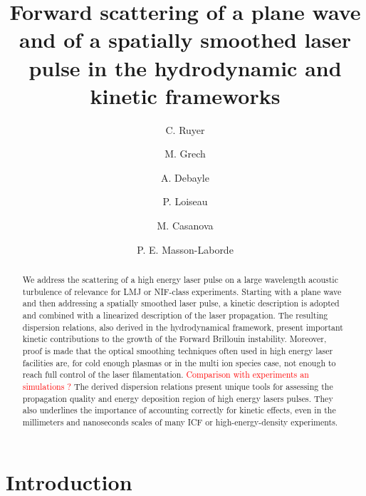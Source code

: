 \documentclass[
 reprint,
 amsmath,amssymb,
 aps,
]{revtex4-1}
\begin{document}
\title{ 
Forward scattering of a plane wave and of a spatially smoothed laser pulse  in the hydrodynamic and kinetic frameworks }
\author{C. Ruyer}
\author{M. Grech}
\author{A. Debayle}
\author{P. Loiseau}
\author{M. Casanova}
\author{P. E. Masson-Laborde}

\begin{abstract}
We address the scattering of a high energy laser pulse on a   large wavelength acoustic turbulence of relevance for LMJ or NIF-class  experiments. 
Starting with a plane wave and then addressing a spatially smoothed laser pulse, 
a kinetic description is adopted and combined with a linearized  description of the laser propagation. The resulting dispersion relations, also derived in the hydrodynamical framework, present important kinetic  contributions to the growth of the Forward Brillouin instability.  
Moreover, proof is made that the optical smoothing techniques  often used in high energy laser facilities are, for cold enough plasmas or in the multi ion species case, not enough to reach full control of the laser filamentation.
\textcolor{red}{Comparison with experiments an simulations ?}
The   derived dispersion relations  present unique tools for assessing the propagation quality and energy deposition region of high energy lasers pulses. They also underlines the importance of accounting correctly for kinetic effects, even in the millimeters and nanoseconds scales of many  ICF or high-energy-density experiments. 
\end{abstract}

\maketitle

\section{Introduction}
\end{document}
